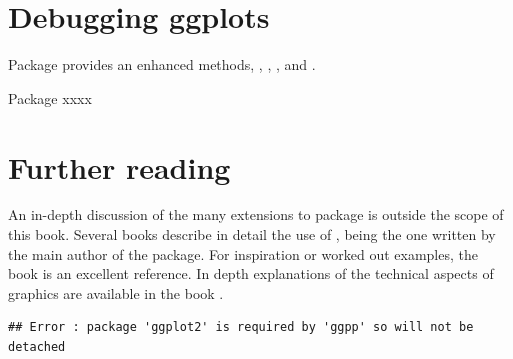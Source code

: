 \documentclass[krantz2]{krantz}\usepackage{knitr}
\begin{document}
\section{Debugging ggplots}

Package  provides an enhanced  methods, , , , and .

Package  xxxx

\section{Further reading}
An in-depth discussion of the many extensions to package  is outside the scope of this book. Several books describe in detail the use of , being  \autocite{Wickham2016} the one written by the main author of the package. For inspiration or worked out examples, the book  \autocite{Chang2018} is an excellent reference. In depth explanations of the technical aspects of \Rlang graphics are available in the book  \autocite{Murrell2019}.

\begin{knitrout}\footnotesize
{}\color{fgcolor}\begin{kframe}
\begin{verbatim}
## Error : package 'ggplot2' is required by 'ggpp' so will not be detached
\end{verbatim}
\end{kframe}
\end{knitrout}







\backmatter

\printbibliography

\printindex\label{idx:general}

\printindex[rindex]\label{idx:rindex}

\printindex[rcatsidx]\label{idx:rcats}

\printindex[faqindex]\label{idx:faqindex}
\end{document}

